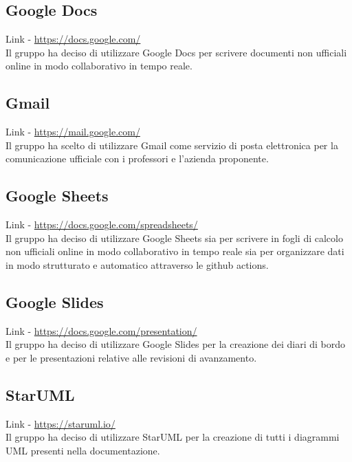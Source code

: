 \subsection{Google Docs}
\label{subsection:google_docs}
Link - \href{https://docs.google.com/}{https://docs.google.com/} \\
Il gruppo ha deciso di utilizzare Google Docs per scrivere documenti non ufficiali online in modo collaborativo in tempo reale.

\subsection{Gmail}
\label{subsection:gmail}
Link - \href{https://mail.google.com/}{https://mail.google.com/} \\
Il gruppo ha scelto di utilizzare Gmail come servizio di posta elettronica per la comunicazione ufficiale con i 
professori e l'azienda proponente.

\subsection{Google Sheets}
\label{subsection:google_sheets}
Link - \href{https://docs.google.com/spreadsheets/}{https://docs.google.com/spreadsheets/} \\
Il gruppo ha deciso di utilizzare Google Sheets sia per scrivere in fogli di calcolo non ufficiali online in modo 
collaborativo in tempo reale sia per organizzare dati in modo strutturato e automatico attraverso le github actions.

\subsection{Google Slides}
\label{subsection:google_slides}
Link - \href{https://docs.google.com/presentation/}{https://docs.google.com/presentation/} \\
Il gruppo ha deciso di utilizzare Google Slides per la creazione dei diari di bordo e per le presentazioni relative 
alle revisioni di avanzamento.

\subsection{StarUML}
\label{subsection:staruml}
Link - \href{https://staruml.io/}{https://staruml.io/} \\
Il gruppo ha deciso di utilizzare StarUML per la creazione di tutti i diagrammi UML presenti nella documentazione.

